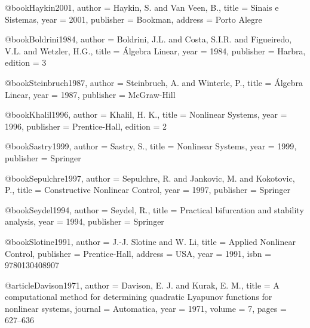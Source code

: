 @book{Haykin2001,
  author = {Haykin, S. and Van Veen, B.},
  title = {Sinais e Sistemas},
  year = {2001},
  publisher = {Bookman},
  address = {Porto Alegre}
}

@book{Boldrini1984,
  author = {Boldrini, J.L. and Costa, S.I.R. and Figueiredo, V.L. and Wetzler, H.G.},
  title = {Álgebra Linear},
  year = {1984},
  publisher = {Harbra},
  edition = {3}
}

@book{Steinbruch1987,
  author = {Steinbruch, A. and Winterle, P.},
  title = {Álgebra Linear},
  year = {1987},
  publisher = {McGraw-Hill}
}

%

@book{Khalil1996,
  author = {Khalil, H. K.},
  title = {Nonlinear Systems},
  year = {1996},
  publisher = {Prentice-Hall},
  edition = {2}
}

@book{Sastry1999,
  author = {Sastry, S.},
  title = {Nonlinear Systems},
  year = {1999},
  publisher = {Springer}
}

@book{Sepulchre1997,
  author = {Sepulchre, R. and Jankovic, M. and Kokotovic, P.},
  title = {Constructive Nonlinear Control},
  year = {1997},
  publisher = {Springer}
}

@book{Seydel1994,
  author = {Seydel, R.},
  title = {Practical bifurcation and stability analysis},
  year = {1994},
  publisher = {Springer}
}

@book{Slotine1991,
  author = {J.-J. Slotine and W. Li},
  title = {Applied Nonlinear Control},
  publisher = {Prentice-Hall},
  address = {USA},
  year = {1991},
  isbn = {9780130408907}
}


@article{Davison1971,
  author = {Davison, E. J. and Kurak, E. M.},
  title = {A computational method for determining quadratic Lyapunov functions for nonlinear systems},
  journal = {Automatica},
  year = {1971},
  volume = {7},
  pages = {627--636}
}

